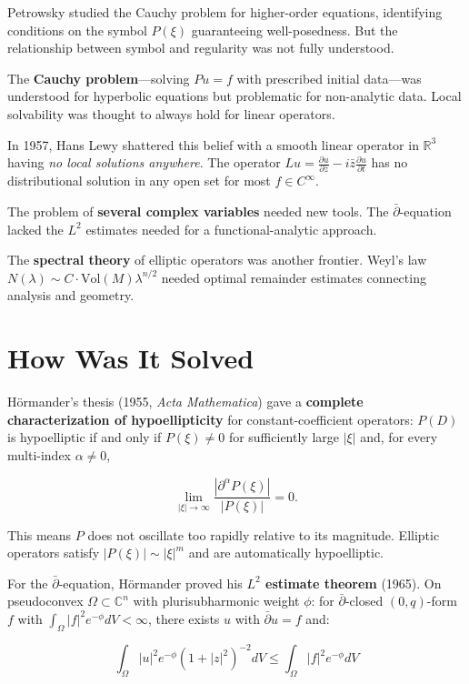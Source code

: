 Petrowsky studied the Cauchy problem for higher-order equations, identifying
conditions on the symbol $P(\xi)$ guaranteeing well-posedness. But the
relationship between symbol and regularity was not fully understood.

The \textbf{Cauchy problem}---solving $Pu = f$ with prescribed initial data---was
understood for hyperbolic equations but problematic for non-analytic data. Local
solvability was thought to always hold for linear operators.

In 1957, Hans Lewy shattered this belief with a smooth linear operator in
$\mathbb{R}^3$ having \emph{no local solutions anywhere}. The operator
$Lu = \frac{\partial u}{\partial \bar{z}} - i\bar{z}\frac{\partial u}{\partial t}$
has no distributional solution in any open set for most $f \in C^\infty$.

The problem of \textbf{several complex variables} needed new tools. The
$\bar{\partial}$-equation lacked the $L^2$ estimates needed for a
functional-analytic approach.

The \textbf{spectral theory} of elliptic operators was another frontier. Weyl's
law $N(\lambda) \sim C \cdot \text{Vol}(M) \lambda^{n/2}$ needed optimal remainder
estimates connecting analysis and geometry.

\section{How Was It Solved}

Hörmander's thesis \cite{hormander1963} (1955, \emph{Acta Mathematica}) gave a \textbf{complete
characterization of hypoellipticity} for constant-coefficient operators:
$P(D)$ is hypoelliptic if and only if $P(\xi)\neq 0$ for sufficiently large
$|\xi|$ and, for every multi-index $\alpha\neq 0$,

\[\lim_{|\xi| \to \infty} \frac{|\partial^\alpha P(\xi)|}{|P(\xi)|} = 0.\]

This means $P$ does not oscillate too rapidly relative to its magnitude. Elliptic
operators satisfy $|P(\xi)| \sim |\xi|^m$ and are automatically hypoelliptic.

For the $\bar{\partial}$-equation, Hörmander proved his \textbf{$L^2$ estimate
theorem} (1965). On pseudoconvex $\Omega \subset \mathbb{C}^n$ with plurisubharmonic
weight $\phi$: for $\bar{\partial}$-closed $(0,q)$-form $f$ with
$\int_\Omega |f|^2 e^{-\phi} dV < \infty$, there exists $u$ with $\bar{\partial}u = f$
and:

\[\int_\Omega |u|^2 e^{-\phi}(1+|z|^2)^{-2} dV \leq \int_\Omega |f|^2 e^{-\phi} dV\]

